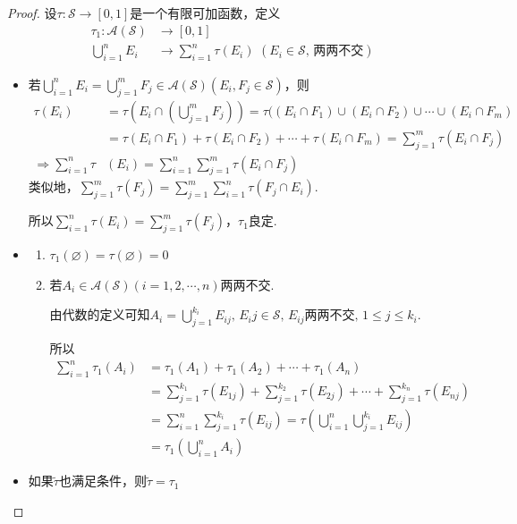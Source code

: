 \begin{proof}
    设$\tau:\mathcal{S}\to[0,1]$是一个有限可加函数，定义
    {\setlength{\jot}{-5pt}\begin{align*}
        \tau_1:\mathcal{A}(\mathcal{S})&\to[0,1]\\
        \bigcup_{i=1}^n{E_i}&\to\sum_{i=1}^n{\tau(E_i)}\,\,(E_i\in\mathcal{S},\,\text{两两不交})
    \end{align*}}
    \begin{itemize}
        \item {}\par
        若$\bigcup_{i=1}^n{E_i}=\bigcup_{j=1}^m{F_j}\in\mathcal{A}(\mathcal{S})(E_i,F_j\in\mathcal{S})$，则
        {\setjot[-5]\begin{align*}
            \tau(E_i)&=\tau\left(E_i\cap\left(\bigcup_{j=1}^m{F_j}\right)\right)=\tau((E_i\cap F_1)\cup(E_i\cap F_2) \cup \cdots\cup(E_i\cap F_m) \\
            &=\tau(E_i\cap F_1)+\tau(E_i\cap F_2)+\cdots+\tau(E_i\cap F_m)=\sum_{j=1}^m\tau(E_i\cap F_j) \\
            \Rightarrow\sum_{i=1}^n\tau&(E_i)=\sum_{i=1}^n\sum_{j=1}^m{\tau(E_i\cap F_j)}
        \end{align*}}
        类似地，$\sum_{j=1}^m{\tau(F_j)}=\sum_{j=1}^m\sum_{i=1}^n{\tau(F_j\cap E_i)}$.\par
        所以$\sum_{i=1}^n{\tau(E_i)}=\sum_{j=1}^m{\tau(F_j)}$，$\tau_1$良定.
        \item {}\par
        \begin{enumerate}[(1)]
            \item $\tau_1(\varnothing)=\tau(\varnothing)=0$
            \item 若$A_i\in\mathcal{A}(\mathcal{S})(i=1,2,\cdots,n)$两两不交.\par
            由代数的定义可知$A_i=\bigcup_{j=1}^{k_i}{E_{ij}},\,E_ij\in\mathcal{S},\,E_{ij}\text{两两不交},\, 1\leqslant j\leqslant k_i$.\par
            所以
            \vspace{-1em}
            {\allowdisplaybreaks[4] %
                \setjot[-5]\begin{align*}
                \sum_{i=1}^n{\tau_1(A_i)}&=\tau_1(A_1)+\tau_1(A_2)+\cdots+\tau_1(A_n)\\
                &=\sum_{j=1}^{k_1}{\tau(E_{1j})}+\sum_{j=1}^{k_2}{\tau(E_{2j})}+\cdots+\sum_{j=1}^{k_n}{\tau(E_{nj})}\\
                &=\sum_{i=1}^n\sum_{j=1}^{k_i}{\tau(E_{ij})}=\tau\left(\bigcup_{i=1}^n\bigcup_{j=1}^{k_i}{E_{ij}}\right)\\
                &=\tau_1\left(\bigcup_{i=1}^n{A_i}\right)
            \end{align*}}
        \end{enumerate}
        \item {}\par
        如果$\tilde{\tau}$也满足条件，则$\tilde{\tau}=\tau_1$  \qedhere
    \end{itemize}
\end{proof}
